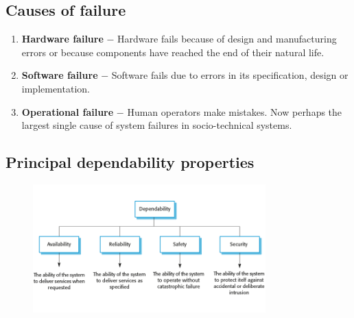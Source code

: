 \subsection{Causes of failure}
\begin{enumerate}
\item \textbf{Hardware failure}
$-$ Hardware fails because of design and manufacturing errors or because components have reached the end of their natural life.
\item \textbf{Software failure}
$-$ Software fails due to errors in its specification, design or implementation.
\item \textbf{Operational failure}
$-$ Human operators make mistakes. Now perhaps the largest single cause of system failures in socio-technical systems.
\end{enumerate}

\subsection{Principal dependability properties}
\begin{figure}[h!]
    \centering
    \includegraphics[width = 0.8\textwidth]{./figures/L4_1.png}
    \caption{}
    \label{fig:L4_1}
\end{figure}


